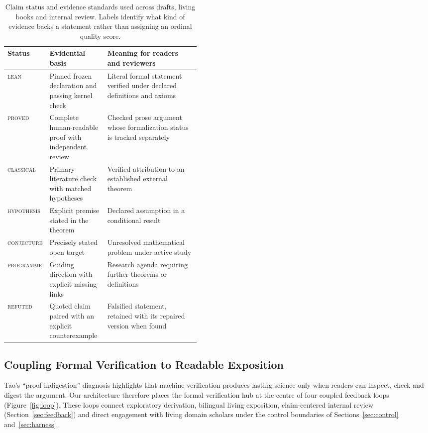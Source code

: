 \documentclass[11pt,a4paper]{article}
\begin{document}
\begin{table}[htbp]
\centering\small
\caption{Claim status and evidence standards used across drafts, living books
and internal review. Labels identify what kind of evidence backs a statement
rather than assigning an ordinal quality score.}
\label{tab:legend}
\begin{tabularx}{\linewidth}{@{}L{0.15\linewidth}L{0.30\linewidth}Y@{}}
\toprule
Status & Evidential basis & Meaning for readers and reviewers \\
\midrule
\textsc{lean} & Pinned frozen declaration and passing kernel check & Literal formal statement verified under declared definitions and axioms \\
\textsc{proved} & Complete human-readable proof with independent review & Checked prose argument whose formalization status is tracked separately \\
\textsc{classical} & Primary literature check with matched hypotheses & Verified attribution to an established external theorem \\
\textsc{hypothesis} & Explicit premise stated in the theorem & Declared assumption in a conditional result \\
\textsc{conjecture} & Precisely stated open target & Unresolved mathematical problem under active study \\
\textsc{programme} & Guiding direction with explicit missing links & Research agenda requiring further theorems or definitions \\
\textsc{refuted} & Quoted claim paired with an explicit counterexample & Falsified statement, retained with its repaired version when found \\
\bottomrule
\end{tabularx}
\end{table}

\subsection{Coupling Formal Verification to Readable Exposition}
\label{sec:architecture}
Tao's ``proof indigestion'' diagnosis \citep{tao2026age} highlights that
machine verification produces lasting science only when readers can inspect,
check and digest the argument. Our architecture therefore places the formal
verification hub at the centre of four coupled feedback loops
(Figure~\ref{fig:loop}). These loops connect exploratory derivation, bilingual
living exposition, claim-centered internal review (Section~\ref{sec:feedback})
and direct engagement with living domain scholars under the control boundaries
of Sections~\ref{sec:control} and~\ref{sec:harness}.
\end{document}
